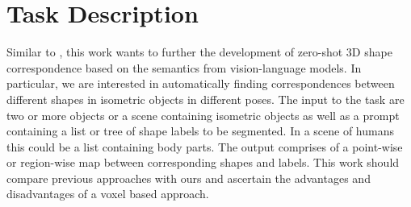 \section{Task Description}
\label{sec:task_description}

Similar to \citet{abdelreheem_zero-shot_2023}, this work wants to further the development of zero-shot 3D shape correspondence based on the semantics from vision-language models. In particular, we are interested in automatically finding correspondences between different shapes in isometric objects in different poses. The input to the task are two or more objects or a scene containing isometric objects as well as a prompt containing a list or tree of shape labels to be segmented. In a scene of humans this could be a list containing body parts. The output comprises of a point-wise or region-wise map between corresponding shapes and labels.
This work should compare previous approaches with ours and ascertain the advantages and disadvantages of a voxel based approach.